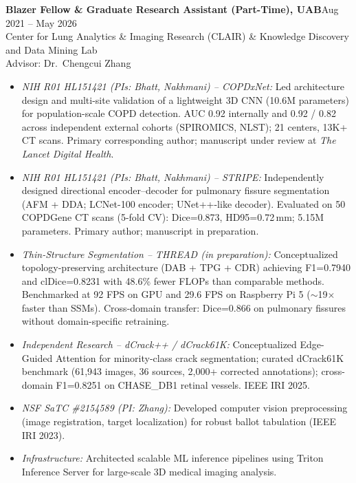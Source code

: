 \documentclass[11pt]{article}
\newcommand{\cventry}[3]{%
  \noindent\textbf{#1}\hfill #2\\
  \noindent #3 \par
}
\begin{document}
\cventry
{Blazer Fellow \& Graduate Research Assistant (Part-Time), UAB}
{Aug 2021 -- May 2026}
{Center for Lung Analytics \& Imaging Research (CLAIR) \& Knowledge Discovery and Data Mining Lab\\
Advisor: Dr.\ Chengcui Zhang
\begin{itemize}
  \item \textit{NIH R01 HL151421 (PIs: Bhatt, Nakhmani) -- COPDxNet:} Led architecture design and multi-site validation of a lightweight 3D CNN (10.6M parameters) for population-scale COPD detection. AUC 0.92 internally and 0.92 / 0.82 across independent external cohorts (SPIROMICS, NLST); 21 centers, 13K+ CT scans. Primary corresponding author; manuscript under review at \textit{The Lancet Digital Health}.

  \item \textit{NIH R01 HL151421 (PIs: Bhatt, Nakhmani) -- STRIPE:} Independently designed directional encoder--decoder for pulmonary fissure segmentation (AFM + DDA; LCNet-100 encoder; UNet++-like decoder). Evaluated on 50 COPDGene CT scans (5-fold CV): Dice=0.873, HD95=0.72\,mm; 5.15M parameters. Primary author; manuscript in preparation.

  \item \textit{Thin-Structure Segmentation -- THREAD (in preparation):} Conceptualized topology-preserving architecture (DAB + TPG + CDR) achieving F1=0.7940 and clDice=0.8231 with 48.6\% fewer FLOPs than comparable methods. Benchmarked at 92 FPS on GPU and 29.6 FPS on Raspberry Pi 5 ($\sim$19$\times$ faster than SSMs). Cross-domain transfer: Dice=0.866 on pulmonary fissures without domain-specific retraining.

  \item \textit{Independent Research -- dCrack++ / dCrack61K:} Conceptualized Edge-Guided Attention for minority-class crack segmentation; curated dCrack61K benchmark (61,943 images, 36 sources, 2,000+ corrected annotations); cross-domain F1=0.8251 on CHASE\_DB1 retinal vessels. IEEE IRI 2025.

  \item \textit{NSF SaTC \#2154589 (PI: Zhang):} Developed computer vision preprocessing (image registration, target localization) for robust ballot tabulation (IEEE IRI 2023).

  \item \textit{Infrastructure:} Architected scalable ML inference pipelines using Triton Inference Server for large-scale 3D medical imaging analysis.
\end{itemize}
}
\end{document}
